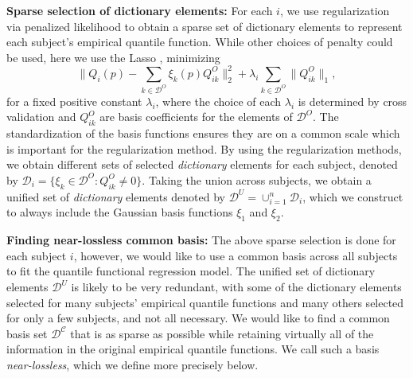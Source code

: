 \documentclass[11pt]{article}
\begin{document}
\textbf{Sparse selection of dictionary elements:} For each $i$, we use regularization via penalized likelihood to obtain a sparse set of dictionary  elements to represent each subject's empirical quantile function.  While other choices of penalty could be used, here we use the Lasso \cite{tibshirani1996regression}, minimizing
 \begin{equation}   \label{p5_lasso}
 \| Q_{i}(p) - \sum_{k \in \mathcal{D}^{O}   } \xi_k(p)Q_{ik}^{O  }\|^2_{2}+
 \lambda_i \sum_{k \in \mathcal{D}^{O}    }\|Q_{ik}^{O}\|_{1}, 
 \end{equation}
for a fixed positive constant $\lambda_i$, where the choice of each $\lambda_i$ 
is determined by cross validation and  $Q_{ik}^{O}$ are basis coefficients for the elements of $\mathcal{D}^{O} $.  
The standardization of the basis functions  ensures they are on a common scale which is important for the regularization method.  
By using the regularization methods, we obtain different sets of  selected {\it dictionary} elements for each 
subject,  denoted by 
$\mathcal{D}_i=\{ \xi_k \in  \mathcal{D}^{O}  :  Q_{ik}^{O} \ne 0 \}$.  Taking the union across subjects, we obtain a unified set of  {\it dictionary} elements denoted by 
 $\mathcal{D}^U= \cup_{i=1}^{n} \mathcal{D}_i$, which we construct to always include the Gaussian basis functions $\xi_1$ and $\xi_2$.
 
 
 \textbf{Finding near-lossless common basis:}  
The above sparse selection is done for each subject $i$, however, we would like to use a common 
basis across all subjects to fit the quantile functional regression model.  The unified set of dictionary elements $\mathcal{D}^U$ is likely to be very redundant, with some of the dictionary elements selected for many subjects' empirical quantile functions and many others selected for only a few subjects, and not all necessary.  We would like to  find a common basis set $\mathcal{D}^\mathcal{C}$ that is as sparse as possible while retaining virtually all of the information in the original empirical quantile functions.  
We call such a basis \textit{near-lossless}, which we define more precisely below.  
\end{document}
